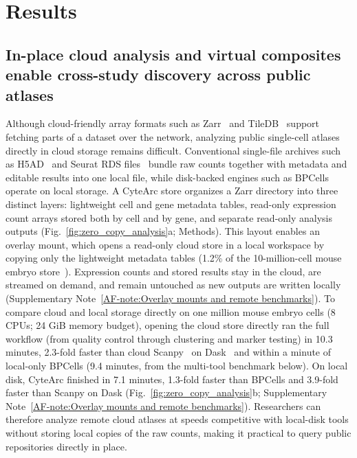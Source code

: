 \documentclass[11pt]{article}
\newcommand{\sref}[1]{\ref*{AF-#1}}
\begin{document}
\section*{Results}

\subsection*{In-place cloud analysis and virtual composites enable cross-study discovery across public atlases}\label{sec:Mount and Virtualize}

Although cloud-friendly array formats such as Zarr~\cite{moore2021omengff} and TileDB~\cite{papadopoulos2016tiledb} support fetching parts of a dataset over the network, analyzing public single-cell atlases directly in cloud storage remains difficult. Conventional single-file archives such as H5AD~\cite{virshup2024} and Seurat RDS files~\cite{hao2024seurat} bundle raw counts together with metadata and editable results into one local file, while disk-backed engines such as BPCells~\cite{parks2025bpcells} operate on local storage. A CyteArc store organizes a Zarr directory into three distinct layers: lightweight cell and gene metadata tables, read-only expression count arrays stored both by cell and by gene, and separate read-only analysis outputs (Fig.~\ref{fig:zero_copy_analysis}a; Methods). This layout enables an overlay mount, which opens a read-only cloud store in a local workspace by copying only the lightweight metadata tables (1.2\% of the 10-million-cell mouse embryo store~\cite{qiu2024}). Expression counts and stored results stay in the cloud, are streamed on demand, and remain untouched as new outputs are written locally (Supplementary Note~\sref{note:Overlay mounts and remote benchmarks}). To compare cloud and local storage directly on one million mouse embryo cells (8 CPUs; 24 GiB memory budget), opening the cloud store directly ran the full workflow (from quality control through clustering and marker testing) in 10.3 minutes, 2.3-fold faster than cloud Scanpy~\cite{wolf2018} on Dask~\cite{scanpydask} and within a minute of local-only BPCells (9.4 minutes, from the multi-tool benchmark below). On local disk, CyteArc finished in 7.1 minutes, 1.3-fold faster than BPCells and 3.9-fold faster than Scanpy on Dask (Fig.~\ref{fig:zero_copy_analysis}b; Supplementary Note~\sref{note:Overlay mounts and remote benchmarks}). Researchers can therefore analyze remote cloud atlases at speeds competitive with local-disk tools without storing local copies of the raw counts, making it practical to query public repositories directly in place.
\end{document}
